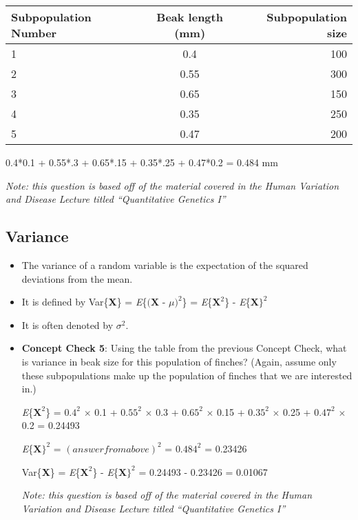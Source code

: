 \documentclass[12pt]{report}
\begin{document}
\begin{itemize}
\bigskip
\begin{tabular}{| l | c | r |}
	\hline
 Subpopulation Number & Beak length (mm) & Subpopulation size \\ \hline
  1 & 0.4 & 100 \\
  2 & 0.55 &  300 \\
  3 & 0.65 & 150 \\ 
  4 & 0.35 &  250 \\
  5 & 0.47 & 200 \\  \hline
\end{tabular}

\bigskip

\color{red} 0.4*0.1 + 0.55*.3 + 0.65*.15 + 0.35*.25 + 0.47*0.2 = 0.484 mm

\color{black}

\bigskip
\textit{Note: this question is based off of the material covered in the Human Variation and Disease Lecture titled ``Quantitative Genetics I''}

\end{itemize}

\subsection{Variance}

\begin{itemize}

\item The variance of a random variable is the expectation of the squared deviations from the mean.

\item It is defined by Var\{\textbf{X}\} =  \textit{E}\{$\big (\textbf{X - $\mu$}\big)^{2}$\} = \textit{E}\{$\textbf{X}^{2}$\} -  \textit{E}\{$\textbf{X}\}^{2}$

\item It is often denoted by $\sigma^{2}$.

\item \textbf{Concept Check 5}: Using the table from the previous Concept Check, what is variance in beak size for this population of finches? (Again, assume only these subpopulations make up the population of finches that we are interested in.)

\bigskip

\color{red} \textit{E}\{$\textbf{X}^{2}$\} = $0.4^2$ $\times$ 0.1 + $0.55^2$  $\times$ 0.3 + $0.65^2$  $\times$ 0.15 + $0.35^2$  $\times$ 0.25 + $0.47^2$  $\times$ 0.2 = 0.24493

\textit{E}\{$\textbf{X}\}^{2}$ = $(answer from above)^2$ = $0.484^2$ = 0.23426

Var\{\textbf{X}\} =  \textit{E}\{$\textbf{X}^{2}$\} -  \textit{E}\{$\textbf{X}\}^{2}$ = 0.24493 - 0.23426 = 0.01067

\color{black}
\bigskip
\textit{Note: this question is based off of the material covered in the Human Variation and Disease Lecture titled ``Quantitative Genetics I''}


\end{itemize}
\end{document}
